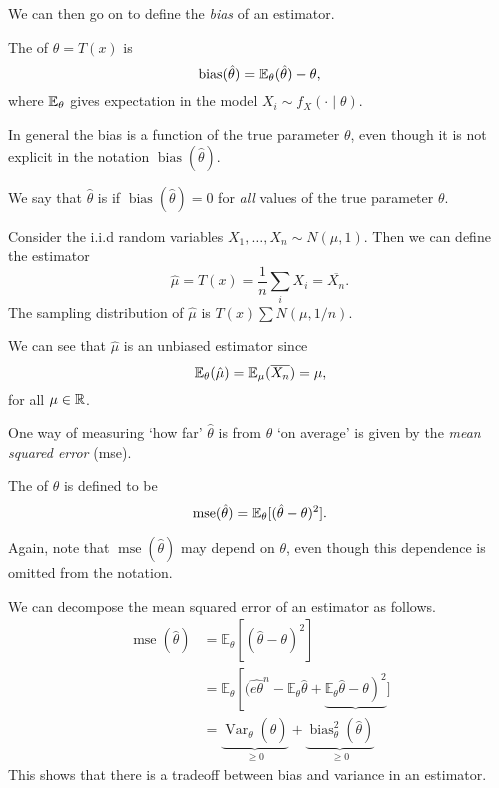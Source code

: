 \documentclass[a4paper]{scrartcl}
\begin{document}
We can then go on to define the \emph{bias} of an estimator.

\begin{definition}[Bias]
  The  of $\hat{\theta} = T(x)$ is
  $$
  \operatorname{bias}(\hat{\theta}) = \mathbb{E}_{\theta} (\hat{\theta}) - \theta,
  $$
  where $\mathbb{E}_\theta$ gives expectation in the model $X_i \sim f_X(\cdot \mid \theta)$.
\end{definition}

\begin{remark}
  In general the bias is a function of the true parameter $\theta$, even though it is not explicit in the notation $\operatorname{bias}(\hat{\theta})$.
\end{remark}

\begin{definition}
  We say that $\hat{\theta}$ is  if $\operatorname{bias}(\hat{\theta}) = 0$ for \emph{all} values of the true parameter $\theta$.  
\end{definition}

\begin{example}
  Consider the i.i.d random variables $X_1, \dots, X_n \sim N(\mu, 1)$. Then we can define the estimator
  $$
  \hat{\mu} = T(x) = \frac{1}{n}\sum_{i} X_i = \overline{X_n}.
  $$
  The sampling distribution of $\hat{\mu}$ is $T(x) \sum N(\mu, 1/n)$.

  We can see that $\hat{\mu}$ is an unbiased estimator since
  $$
  \mathbb{E}_\theta(\hat{\mu}) = \mathbb{E}_{\mu}(\overline{X_n}) = \mu,
  $$
  for all $\mu \in \mathbb{R}$.
\end{example}

One way of measuring `how far' $\hat{\theta}$ is from $\theta$ `on average' is given by the \emph{mean squared error} (mse).

\begin{definition}
The  of $\theta$ is defined to be
$$
\operatorname{mse}(\hat{\theta}) = \mathbb{E}_{\theta}[(\hat{\theta} - \theta)^2].
$$
\end{definition}

Again, note that $\operatorname{mse}(\hat{\theta})$ may depend on $\theta$, even though this dependence is omitted from the notation.

\begin{method}
  We can decompose the mean squared error of an estimator as follows.
  \begin{align*}
      \operatorname{mse}(\hat{\theta}) &=\mathbb{E}_{\theta}\left[(\hat{\theta}-\theta)^{2}\right] \\
      &=\mathbb{E}_{\theta}\left[(\hat{e\theta}^{n}-\mathbb{E}_{\theta} \hat{\theta}+\underbrace{\left.\mathbb{E}_{\theta} \hat{\theta}-\theta\right)^{2}}]\right.\\
      &=\underbrace{\operatorname{Var}_\theta(\hat{\theta})}_{\geqslant 0}+\underbrace{\operatorname{bias}_\theta^{2}(\hat{\theta})}_{\geqslant 0}
  \end{align*}
  This shows that there is a tradeoff between bias and variance in an estimator.
\end{method}
\end{document}
